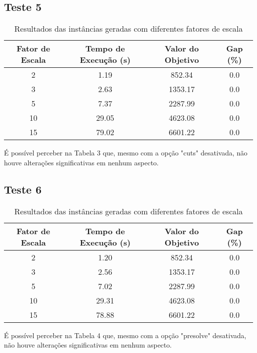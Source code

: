 \documentclass[a4paper,12pt]{article}
\begin{document}
\subsection{Teste 5}

\begin{table}[h!]
    \centering
    \begin{tabular}{|c|c|c|c|}
        \hline
        \textbf{Fator de Escala} & \textbf{Tempo de Execução (s)} & \textbf{Valor do Objetivo} & \textbf{Gap (\%)} \\
        \hline
        2 & 1.19 & 852.34 & 0.0 \\
        3 & 2.63 & 1353.17 & 0.0 \\
        5 & 7.37 & 2287.99 & 0.0 \\
        10 & 29.05 & 4623.08 & 0.0 \\
        15 & 79.02 & 6601.22 & 0.0 \\
        \hline
    \end{tabular}
    \caption{Resultados das instâncias geradas com diferentes fatores de escala}
    \label{tab:resultados}
\end{table}

É possível perceber na Tabela 3 que, mesmo com a opção "cuts" desativada, não houve alterações significativas em nenhum aspecto. 

\subsection{Teste 6}

\begin{table}[h!]
    \centering
    \begin{tabular}{|c|c|c|c|}
        \hline
        \textbf{Fator de Escala} & \textbf{Tempo de Execução (s)} & \textbf{Valor do Objetivo} & \textbf{Gap (\%)} \\
        \hline
        2 & 1.20 & 852.34 & 0.0 \\
        3 & 2.56 & 1353.17 & 0.0 \\
        5 & 7.02 & 2287.99 & 0.0 \\
        10 & 29.31 & 4623.08 & 0.0 \\
        15 & 78.88 & 6601.22 & 0.0 \\
        \hline
    \end{tabular}
    \caption{Resultados das instâncias geradas com diferentes fatores de escala}
    \label{tab:resultados}
\end{table}

É possível perceber na Tabela 4 que, mesmo com a opção "presolve" desativada, não houve alterações significativas em nenhum aspecto.
\end{document}
